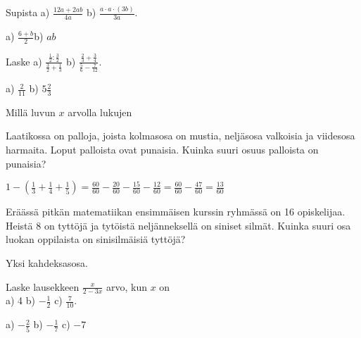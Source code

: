 \begin{tehtavasivu}
\begin{tehtava}
Supista \quad
a) $\frac{12a+2ab}{4a}$ \qquad b) $\frac{a\cdot a\cdot (3b)}{3a}$.
\begin{vastaus}
a) $\frac{6+b}{2}$\qquad b) $ab$
\end{vastaus}
\end{tehtava}

\begin{tehtava}Laske
a) $\frac{\frac{1}{2}:\frac{3}{2}}{\frac{3}{2}+\frac{1}{3}}$ \qquad b) $\frac{\frac{2}{3}+\frac{3}{4}}{\frac{5}{6}-\frac{7}{12}}$.
\begin{vastaus}
a) $\frac{2}{11}$ \qquad b) $5\frac{2}{3}$
\end{vastaus}
\end{tehtava}

\begin{tehtava}
Millä luvun $x$ arvolla lukujen 
\begin{vastaus}
\end{vastaus}
\end{tehtava}

\begin{tehtava} 
        Laatikossa on palloja, joista kolmasosa on mustia, neljäsosa
        valkoisia ja viidesosa harmaita. Loput palloista ovat punaisia.
        Kuinka suuri osuus palloista on punaisia?
        
        \begin{vastaus}
            $1-(\frac{1}{3}+\frac{1}{4}+\frac{1}{5})
            = \frac{60}{60}-\frac{20}{60}-\frac{15}{60}-\frac{12}{60}
            = \frac{60}{60}-\frac{47}{60}
            = \frac{13}{60}$
        \end{vastaus}
    \end{tehtava}
    
\begin{tehtava} 
Eräässä pitkän matematiikan ensimmäisen kurssin ryhmässä on 16 opiskelijaa. Heistä 8 on tyttöjä ja tytöistä neljänneksellä on siniset silmät. Kuinka suuri osa luokan oppilaista on sinisilmäisiä tyttöjä?
        \begin{vastaus}
			Yksi kahdeksasosa.
        \end{vastaus}
\end{tehtava}

\begin{tehtava}
Laske lausekkeen $\frac{x}{2-3x}$ arvo, kun $x$ on \\ a) 4 \qquad b) $-\frac{1}{2}$ \qquad c) $\frac{7}{10}$.
\begin{vastaus}
a) $-\frac{2}{5}$ \qquad b) $-\frac{1}{7}$ \qquad c) $-7$
\end{vastaus}
\end{tehtava}


\end{tehtavasivu}

